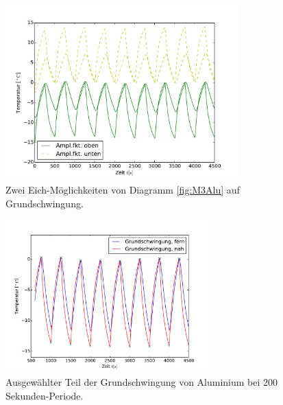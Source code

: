 \begin{figure}[h!]
	\centering
	\includegraphics[width=0.8\textwidth]{Bilder/Normierungsauswahl/M3_Messing_norm.pdf}
	\caption{Zwei Eich-Möglichkeiten von Diagramm \ref{fig:M3Alu} auf Grundschwingung.}
	\label{fig:M3AluNorm}
\end{figure}
\begin{figure}[h!]
	\centering
	\includegraphics[width=0.7\textwidth]{Bilder/M3_Alu_norm.pdf}
	\caption{Ausgewählter Teil der Grundschwingung von Aluminium bei 200 Sekunden-Periode.}
	\label{fig:M3AluNormkurve}
\end{figure}
